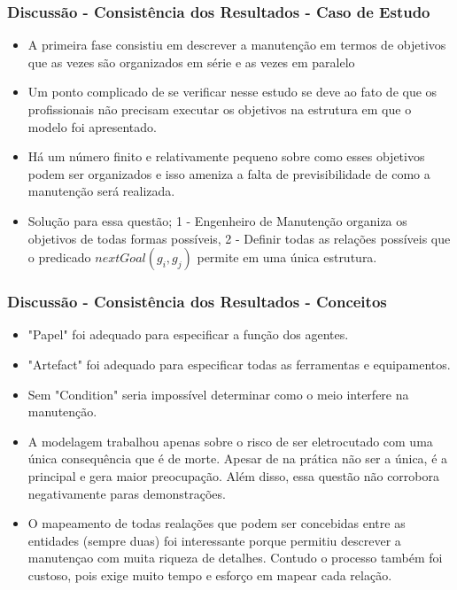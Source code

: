 \documentclass{beamer}
\begin{document}
\begin{frame}
	\frametitle{Discussão - Consistência dos Resultados - Caso de Estudo}
	\begin{itemize}
		\item A primeira fase consistiu em descrever a manutenção em termos de objetivos que as vezes são organizados em série e as vezes em paralelo
		\item Um ponto  complicado de se verificar nesse estudo se deve ao fato de que os profissionais não precisam executar os objetivos na estrutura em que o modelo foi apresentado.
		\item Há um número finito e relativamente pequeno sobre como esses objetivos podem ser organizados e isso ameniza a falta de previsibilidade de como a manutenção será realizada.
		\item Solução para essa questão; 1 - Engenheiro de Manutenção organiza os objetivos de todas formas possíveis, 2 - Definir todas as relações possíveis que o predicado $nextGoal(g_i,g_j)$ permite em uma única estrutura.
	\end{itemize}
\end{frame}


\begin{frame}
	\frametitle{Discussão - Consistência dos Resultados - Conceitos}
	\begin{itemize}
		\item "Papel" foi adequado para especificar a função dos agentes.
		\item "Artefact" foi adequado para especificar todas as ferramentas e equipamentos.
		\item Sem "Condition" seria impossível determinar como o meio interfere na manutenção.
		\item A modelagem trabalhou apenas sobre o risco de ser eletrocutado com uma única consequência que é de morte. Apesar de na prática não ser a única, é a principal e gera maior preocupação. Além disso, essa questão não corrobora negativamente paras demonstrações.
		\item O mapeamento de todas realações que podem ser concebidas entre as entidades (sempre duas) foi interessante porque permitiu descrever a manutençao com muita riqueza de detalhes. Contudo o processo também foi custoso, pois exige muito tempo e esforço em mapear cada relação.  
	\end{itemize}
\end{frame}
\end{document}
